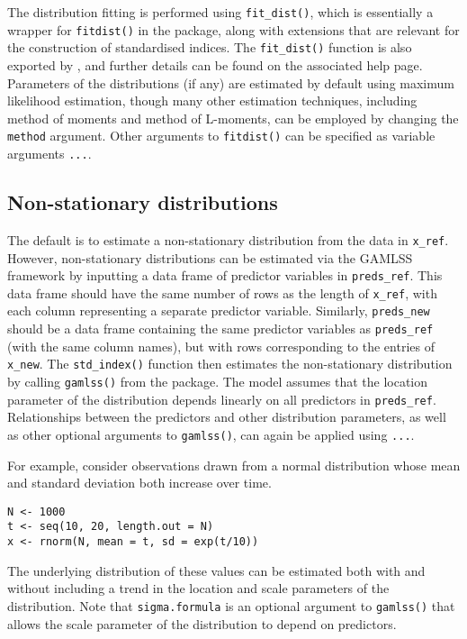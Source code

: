 The distribution fitting is performed using \texttt{fit\_dist()}, which is essentially a wrapper for \texttt{fitdist()} in the  package, along with extensions that are relevant for the construction of standardised indices. The \texttt{fit\_dist()} function is also exported by , and further details can be found on the associated help page. Parameters of the distributions (if any) are estimated by default using maximum likelihood estimation, though many other estimation techniques, including method of moments and method of L-moments, can be employed by changing the \texttt{method} argument. Other arguments to \texttt{fitdist()} can be specified as variable arguments \texttt{...}.

\hypertarget{non-stationary-distributions}{%
\subsection{Non-stationary distributions}\label{non-stationary-distributions}}

The default is to estimate a non-stationary distribution from the data in \texttt{x\_ref}. However, non-stationary distributions can be estimated via the GAMLSS framework by inputting a data frame of predictor variables in \texttt{preds\_ref}. This data frame should have the same number of rows as the length of \texttt{x\_ref}, with each column representing a separate predictor variable. Similarly, \texttt{preds\_new} should be a data frame containing the same predictor variables as \texttt{preds\_ref} (with the same column names), but with rows corresponding to the entries of \texttt{x\_new}. The \texttt{std\_index()} function then estimates the non-stationary distribution by calling \texttt{gamlss()} from the  package. The model assumes that the location parameter of the distribution depends linearly on all predictors in \texttt{preds\_ref}. Relationships between the predictors and other distribution parameters, as well as other optional arguments to \texttt{gamlss()}, can again be applied using \texttt{...}.

For example, consider observations drawn from a normal distribution whose mean and standard deviation both increase over time.

\begin{verbatim}
N <- 1000
t <- seq(10, 20, length.out = N)
x <- rnorm(N, mean = t, sd = exp(t/10))
\end{verbatim}

The underlying distribution of these values can be estimated both with and without including a trend in the location and scale parameters of the distribution. Note that \texttt{sigma.formula} is an optional argument to \texttt{gamlss()} that allows the scale parameter of the distribution to depend on predictors.

